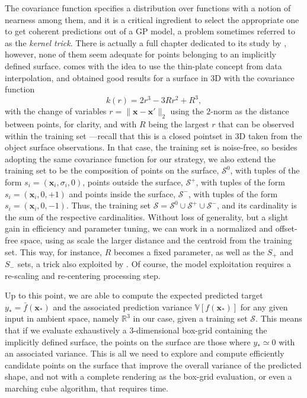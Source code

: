 The covariance function specifies a distribution over functions with a notion of nearness among them, and it is a critical ingredient to select the appropriate one to get coherent predictions out of a GP model, a problem sometimes referred to as the \emph{kernel trick}. There is actually a full chapter dedicated to its study by \citet[see Ch. 4]{Rasmussen2006Gaussian}, however, none of them seem adequate for points belonging to an implicitly defined surface. \citet{Williams2007Gaussian} comes with the idea to use the thin-plate concept from data interpolation, and obtained good results for a surface in 3D with the covariance function
\begin{equation}
k(r) = 2r^{3} - 3Rr^2 + R^3,
\end{equation} 
with the change of variables $r = \| \mathbf{x} - \mathbf{x}' \|_2$ using the $2$-norm as the distance between points, for clarity, and with $R$ being the largest $r$ that can be observed within the training set ---recall that this is a closed pointset in 3D taken from the object surface observations. In that case, the training set is noise-free, so besides adopting the same covariance function for our strategy, we also extend the training set to be the composition of points on the surface, $\mathcal{S}^0$, with tuples of the form $s_i = (\mathbf{x}_i, \sigma_i, 0)$, points outside the surface, $\mathcal{S}^+$, with tuples of the form $s_i = (\mathbf{x}_i, 0, +1)$ and points inside the surface, $\mathcal{S}^-$, with tuples of the form $s_i = (\mathbf{x}_i, 0, -1)$. Thus, the training set $\mathcal{S} = \mathcal{S}^0 \cup \mathcal{S}^+ \cup \mathcal{S}^-$, and its cardinality is the sum of the respective cardinalities. Without loss of generality, but a slight gain in efficiency and parameter tuning, we can work in a normalized and offset-free space, using as scale the larger distance and the centroid from the training set. This way, for instance, $R$ becomes a fixed parameter, as well as the $S_+$ and $S_-$ sets, a trick also exploited by \citet{Li2016Dexterous}. Of course, the model exploitation requires a re-scaling and re-centering processing step.

Up to this point, we are able to compute the expected predicted target $y_* = \bar{f}(\mathbf{x}_*)$ and the associated prediction variance $\mathbb{V}[f(\mathbf{x}_*)]$ for any given input in ambient space, namely $\mathbb{R}^3$ in our case, given a training set $\mathcal{S}$. This means that if we evaluate exhaustively a $3$-dimensional box-grid containing the implicitly defined surface, the points on the surface are those where $y_* \simeq 0$ with an associated variance. This is all we need to explore and compute efficiently candidate points on the surface that improve the overall variance of the predicted shape, and not with a complete rendering as the box-grid evaluation, or even a marching cube algorithm, that requires time. 

